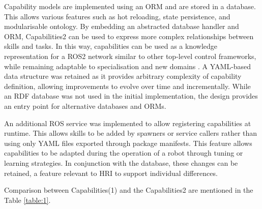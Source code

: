 \documentclass[conference]{IEEEtran}
\begin{document}
Capability models are implemented using an ORM and are stored in a database. This allows various features such as hot reloading, state persistence, and modularisable ontology. By embedding an abstracted database handler and ORM, Capabilities2 can be used to express more complex relationships between skills and tasks. In this way, capabilities can be used as a knowledge representation for a ROS2 network similar to other top-level control frameworks, while remaining adaptable to specialisation and new domains \cite{colledanchise2021implementation,mayr2023skiros2,tenorth2009knowrob}. A YAML-based data structure was retained as it provides arbitrary complexity of capability definition, allowing improvements to evolve over time and incrementally.
While an RDF database was not used in the initial implementation, the design provides an entry point for alternative databases and ORMs. 

An additional ROS service was implemented to allow registering capabilities at runtime. This allows skills to be added by spawners or service callers rather than using only YAML files exported through package manifests. This feature allows capabilities to be adapted during the operation of a robot through tuning or learning strategies. In conjunction with the database, these changes can be retained, a feature relevant to HRI to support individual differences. 

Comparison between Capabilities(1) and the Capabilities2 are mentioned in the Table \ref{table:1}.
\end{document}
